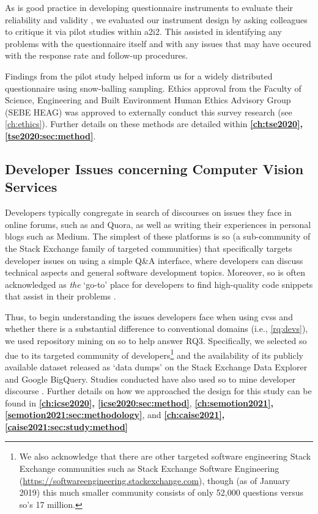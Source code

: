 As is good practice in developing questionnaire instruments to evaluate their reliability and validity \citep{Litwin:1995wt}, we evaluated our instrument design by asking colleagues to critique it via pilot studies within \gls{a2i2}. This assisted in identifying any problems with the questionnaire itself and with any issues that may have occured with the response rate and follow-up procedures.

Findings from the pilot study helped inform us for a widely distributed questionnaire using snow-balling sampling. Ethics approval from the Faculty of Science, Engineering and Built Environment Human Ethics Advisory Group (SEBE HEAG) was approved to externally conduct this survey research (see \cref{ch:ethics}). 
Further details on these methods are detailed within \textbf{\cref{ch:tse2020}, \cref{tse2020:sec:method}}.

\subsection{Developer Issues concerning Computer Vision Services}

Developers typically congregate in search of discourses on issues they face in online forums, such as  and Quora, as well as writing their experiences in personal blogs such as Medium. The simplest of these platforms is \gls{so} (a sub-community of the Stack Exchange family of targeted communities) that specifically targets developer issues on using a simple Q\&A interface, where developers can discuss technical aspects and general software development topics. Moreover, \gls{so} is often acknowledged as \textit{the} `go-to' place for developers to find high-quality code snippets that assist in their problems \citep{Subramanian:2014bg}.

Thus, to begin understanding the issues developers face when using \glspl{cvs} and whether there is a substantial difference to conventional domains (i.e., \ref{rq:devs}), we used repository mining on \gls{so} to help answer RQ3. Specifically, we selected \gls{so} due to its targeted community of developers\footnote{We also acknowledge that there are other targeted software engineering Stack Exchange communities such as Stack Exchange Software Engineering (\url{https://softwareengineering.stackexchange.com}), though (as of January 2019) this much smaller community consists of only 52,000 questions versus \gls{so}'s 17 million.} and the availability of its publicly available dataset released as `data dumps' on the Stack Exchange Data Explorer and Google BigQuery. Studies conducted have also used \gls{so} to mine developer discourse \citep{Choi:2015wo,Sinha:2013tt,Novielli:2015vda,Rosen:2016uk,Pal:2012te,Bajaj:2014wg,LinaresVasquez:2014vj,Wang:2013ue,Barua:2012gz,Reboucas:2016tw,Allamanis:2013is,Tahir:2018ks}.
Further details on how we approached the design for this study can be found in \textbf{\cref{ch:icse2020}, \cref{icse2020:sec:method}}, \textbf{\cref{ch:semotion2021}, \cref{semotion2021:sec:methodology}}, and \textbf{\cref{ch:caise2021}, \cref{caise2021:sec:study:method}}

